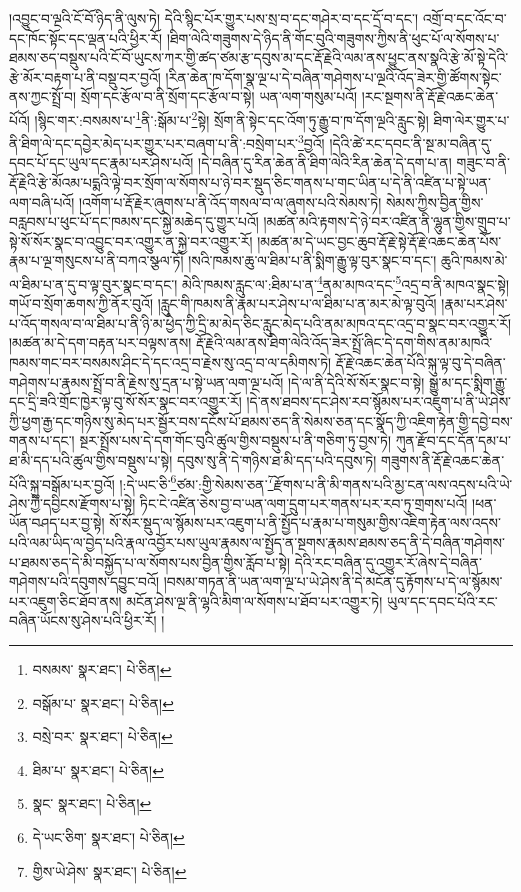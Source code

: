 །འབྱུང་བ་ལྔའི་ངོ་བོ་ཉིད་ནི་ལུས་ཏེ། དེའི་སྙིང་པོར་གྱུར་པས་སྲ་བ་དང་གཤེར་བ་དང་དྲོ་བ་དང་། འགྲོ་བ་དང་འོང་བ་དང་ཁོང་སྟོང་དང་ལྡན་པའི་ཕྱིར་རོ། །ཐིག་ལེའི་གཟུགས་དེ་ཉིད་ནི་གོང་བུའི་གཟུགས་ཀྱིས་ནི་ཕུང་པོ་ལ་སོགས་པ་ཐམས་ཅད་བསྡུས་པའི་ངོ་བོ་ཡུངས་ཀར་གྱི་ཚད་ཙམ་རྩ་དབུས་མ་དང་རྡོ་རྗེའི་ལམ་ནས་ཕྱུང་ནས་སྣའི་རྩེ་མོ་སྟེ་དེའི་རྩེ་མོར་བརྟག་པ་ནི་བསྡུ་བར་བྱའོ། །རིན་ཆེན་ཁ་དོག་སྣ་ལྔ་པ་དེ་བཞིན་གཤེགས་པ་ལྔའི་འོད་ཟེར་གྱི་ཚོགས་སྟེང་ནས་ཀྱང་སྤྲོ་བ། སྲོག་དང་རྩོལ་བ་ནི་སྲོག་དང་རྩོལ་བ་སྟེ། ཡན་ལག་གསུམ་པའོ། །རང་སྔགས་ནི་རྡོ་རྗེ་འཆང་ཆེན་པོའོ། །སྙིང་གར་:བསམས་པ་\footnote{བསམས་  སྣར་ཐང་།  པེ་ཅིན། }ནི་:སྒོམ་པ་\footnote{བསྒོམ་པ་  སྣར་ཐང་།  པེ་ཅིན། }སྟེ། སྲོག་ནི་སྟེང་དང་འོག་ཏུ་རྒྱུ་བ་ཁ་དོག་ལྔའི་རླུང་སྟེ། ཐིག་ལེར་གྱུར་པ་ནི་ཐིག་ལེ་དང་དབྱེར་མེད་པར་གྱུར་པར་བཞག་པ་ནི་:བསྲེག་པར་\footnote{བསྲེ་བར་  སྣར་ཐང་།  པེ་ཅིན། }བྱའོ། །དེའི་ཚེ་རང་དབང་ནི་སྔ་མ་བཞིན་དུ་དབང་པོ་དང་ཡུལ་དང་རྣམ་པར་ཤེས་པའོ། །དེ་བཞིན་དུ་རིན་ཆེན་ནི་ཐིག་ལེའི་རིན་ཆེན་དེ་དག་པ་ན། གཟུང་བ་ནི་རྡོ་རྗེའི་རྩེ་མོའམ་པདྨའི་ལྟེ་བར་སྲོག་ལ་སོགས་པ་ཉེ་བར་སྡུད་ཅིང་གནས་པ་གང་ཡིན་པ་དེ་ནི་འཛིན་པ་སྟེ་ཡན་ལག་བཞི་པའོ། །འགོག་པ་རྡོ་རྗེར་ཞུགས་པ་ནི་འོད་གསལ་བ་ལ་ཞུགས་པའི་སེམས་ཏེ། སེམས་ཀྱིས་བྱིན་གྱིས་བརླབས་པ་ཕུང་པོ་དང་ཁམས་དང་སྐྱེ་མཆེད་དུ་གྱུར་པའོ། །མཚན་མའི་རྟགས་དེ་ཉེ་བར་འཛིན་ནི་ལྷུན་གྱིས་གྲུབ་པ་སྟེ་སོ་སོར་སྣང་བ་འབྱུང་བར་འགྱུར་ན་སྐྱེ་བར་འགྱུར་རོ། །མཚན་མ་དེ་ཡང་བྱང་ཆུབ་རྡོ་རྗེ་སྟེ་རྡོ་རྗེ་འཆང་ཆེན་པོས་རྣམ་པ་ལྔ་གསུངས་པ་ནི་བཀའ་སྩལ་ཏོ། །སའི་ཁམས་ཆུ་ལ་ཐིམ་པ་ནི་སྨིག་རྒྱུ་ལྟ་བུར་སྣང་བ་དང་། ཆུའི་ཁམས་མེ་ལ་ཐིམ་པ་ན་དུ་བ་ལྟ་བུར་སྣང་བ་དང་། མེའི་ཁམས་རླུང་ལ་:ཐིམ་པ་ན་\footnote{ཐིམ་པ་  སྣར་ཐང་།  པེ་ཅིན། }ནམ་མཁའ་དང་\footnote{སྣང་  སྣར་ཐང་།  པེ་ཅིན། }འདྲ་བ་ནི་མཁའ་སྣང་སྟེ། གཡོ་བ་སྲོག་ཆགས་ཀྱི་ནོར་བུའོ། །རླུང་གི་ཁམས་ནི་རྣམ་པར་ཤེས་པ་ལ་ཐིམ་པ་ན་མར་མེ་ལྟ་བུའོ། །རྣམ་པར་ཤེས་པ་འོད་གསལ་བ་ལ་ཐིམ་པ་ནི་ཉི་མ་ཕྱེད་ཀྱི་དྲི་མ་མེད་ཅིང་རླུང་མེད་པའི་ནམ་མཁའ་དང་འདྲ་བ་སྣང་བར་འགྱུར་རོ། །མཚན་མ་དེ་དག་བརྟན་པར་བལྟས་ནས། རྡོ་རྗེའི་ལམ་ནས་ཐིག་ལེའི་འོད་ཟེར་སྤྲོ་ཞིང་དེ་དག་གིས་ནམ་མཁའི་ཁམས་གང་བར་བསམས་ཤིང་དེ་དང་འདྲ་བ་རྗེས་སུ་འདྲ་བ་ལ་དམིགས་ཏེ། རྡོ་རྗེ་འཆང་ཆེན་པོའི་སྐུ་ལྟ་བུ་དེ་བཞིན་གཤེགས་པ་རྣམས་སྤྲོ་བ་ནི་རྗེས་སུ་དྲན་པ་སྟེ་ཡན་ལག་ལྔ་པའོ། །དེ་ལ་ནི་དེའི་སོ་སོར་སྣང་བ་སྟེ། སྒྱུ་མ་དང་སྨིག་རྒྱུ་དང་དྲི་ཟའི་གྲོང་ཁྱེར་ལྟ་བུ་སོ་སོར་སྣང་བར་འགྱུར་རོ། །དེ་ནས་ཐབས་དང་ཤེས་རབ་སྙོམས་པར་འཇུག་པ་ནི་ཡེ་ཤེས་ཀྱི་ཕྱག་རྒྱ་དང་གཉིས་སུ་མེད་པར་སྦྱོར་བས་དངོས་པོ་ཐམས་ཅད་ནི་སེམས་ཅན་དང་སྣོད་ཀྱི་འཇིག་རྟེན་གྱི་དབྱེ་བས་གནས་པ་དང་། སྔར་སྤྲོས་པས་དེ་དག་གོང་བུའི་ཚུལ་གྱིས་བསྡུས་པ་ནི་གཅིག་ཏུ་བྱས་ཏེ། ཀུན་རྫོབ་དང་དོན་དམ་པ་ཐ་མི་དད་པའི་ཚུལ་གྱིས་བསྡུས་པ་སྟེ། དབུས་སུ་ནི་དེ་གཉིས་ཐ་མི་དད་པའི་དབུས་ཏེ། གཟུགས་ནི་རྡོ་རྗེ་འཆང་ཆེན་པོའི་སྐུ་བསྒོམ་པར་བྱའོ། །:དེ་ཡང་ཅི་\footnote{དེ་ཡང་ཅིག་  སྣར་ཐང་།  པེ་ཅིན། }ཙམ་:གྱི་སེམས་ཅན་\footnote{གྱིས་ཡེ་ཤེས་  སྣར་ཐང་།  པེ་ཅིན། }རྫོགས་པ་ནི་མི་གནས་པའི་མྱ་ངན་ལས་འདས་པའི་ཡེ་ཤེས་ཀྱི་དབྱིངས་རྫོགས་པ་སྟེ། ཏིང་ངེ་འཛིན་ཅེས་བྱ་བ་ཡན་ལག་དྲུག་པར་གནས་པར་རབ་ཏུ་གྲགས་པའོ། །ཕན་ཡོན་བཤད་པར་བྱ་སྟེ། སོ་སོར་སྡུད་ལ་སྙོམས་པར་འཇུག་པ་ནི་སྤྱོད་པ་རྣམ་པ་གསུམ་གྱིས་འཇིག་རྟེན་ལས་འདས་པའི་ལམ་ཡིད་ལ་བྱེད་པའི་རྣལ་འབྱོར་པས་ཡུལ་རྣམས་ལ་སྤྱོད་ན་སྔགས་རྣམས་ཐམས་ཅད་ནི་དེ་བཞིན་གཤེགས་པ་ཐམས་ཅད་དེ་མི་བསྐྱོད་པ་ལ་སོགས་པས་བྱིན་གྱིས་རློབ་པ་སྟེ། དེའི་རང་བཞིན་དུ་འགྱུར་རོ་ཞེས་དེ་བཞིན་གཤེགས་པའི་དབུགས་དབྱུང་བའོ། །བསམ་གཏན་ནི་ཡན་ལག་ལྔ་པ་ཡེ་ཤེས་ནི་དེ་མངོན་དུ་རྟོགས་པ་དེ་ལ་སྙོམས་པར་འཇུག་ཅིང་ཐོབ་ནས། མངོན་ཤེས་ལྔ་ནི་ལྷའི་མིག་ལ་སོགས་པ་ཐོབ་པར་འགྱུར་ཏེ། ཡུལ་དང་དབང་པོའི་རང་བཞིན་ཡོངས་སུ་ཤེས་པའི་ཕྱིར་རོ། །
